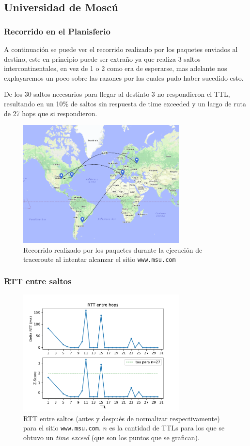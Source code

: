 \subsection*{Universidad de Moscú}

\subsubsection*{Recorrido en el Planisferio}

A continuación se puede ver el recorrido realizado por los paquetes enviados al destino, este en principio puede ser extraño ya que realiza 3 saltos intercontinentales, en vez de 1 o 2 como era de esperarse, mas adelante nos explayaremos un poco sobre las razones por las cuales pudo haber sucedido esto.

De los 30 saltos necesarios para llegar al destinto 3 no respondieron el TTL, resultando en un 10\% de saltos sin respuesta de time exceeded y un largo de ruta de 27 hops que si respondieron.

\begin{figure}[H]
  \centering
  \includegraphics[width=8.5cm]{figs/moscow.png}
  \caption{\footnotesize Recorrido realizado por los paquetes durante la ejecución de traceroute al intentar alcanzar el sitio \texttt{www.msu.com}}
\end{figure}

\subsubsection*{RTT entre saltos}

\begin{figure}[H]
  \centering
  \includegraphics[width=8.5cm]{figs/traceroute-moscow.pdf}
  \caption{\footnotesize RTT entre saltos (antes y después de normalizar respectivamente) para el sitio \texttt{www.msu.com}. $n$ es la cantidad de TTLs para los que se obtuvo un \emph{time exceed} (que son los puntos que se grafican).}
  \label{plot-moscow}
\end{figure}

